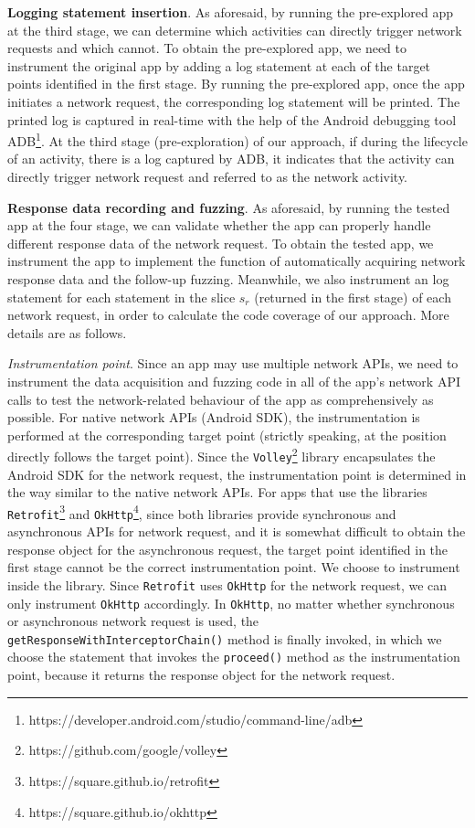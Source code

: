 \documentclass[sigconf,review, anonymous]{acmart}
\begin{document}
\textbf{Logging statement insertion}. As aforesaid, by running the pre-explored app at the third stage, we can determine which activities can directly trigger network requests and which cannot. To obtain the pre-explored app, we need to instrument the original app by adding a log statement at each of the target points identified in the first stage.  By running the pre-explored app, once the app initiates a network request, the corresponding log statement will be printed. The printed log is captured in real-time with the help of the Android debugging tool \textsf{ADB}\footnote{https://developer.android.com/studio/command-line/adb}. At the third stage (pre-exploration) of our approach, if during the lifecycle of an activity, there is a log captured by \textsf{ADB}, it indicates that the activity can directly trigger network request and referred to as the network activity.


\textbf{Response data recording and fuzzing}. As aforesaid, by running the tested app at the four stage, we can validate whether the app can properly handle different response data of the network request. To obtain the tested app,  
we instrument the app to implement the function of automatically acquiring network response data and the follow-up fuzzing. Meanwhile, we also instrument an log statement for each statement in the slice $s_r$ (returned in the first stage) of each network request, in order to calculate the code coverage of our approach. More details are as follows.

\textit{Instrumentation point}. Since an app may use multiple network APIs, we need to instrument the data acquisition and fuzzing code in all of the app's network API calls to test the network-related behaviour of the app as comprehensively as possible. For native network APIs (Android SDK), the instrumentation is performed at the corresponding target point (strictly speaking, at the position directly follows the target point). Since the \texttt{Volley}\footnote{https://github.com/google/volley} library encapsulates the Android SDK for the network request, the instrumentation point is determined in the way similar to the  native network APIs. For apps that use the libraries \texttt{Retrofit}\footnote{https://square.github.io/retrofit} and \texttt{OkHttp}\footnote{https://square.github.io/okhttp}, since both libraries provide synchronous and asynchronous APIs for network request, and it is somewhat difficult to obtain the response object for the asynchronous request, the target point identified in the first stage cannot be the correct instrumentation point. We choose to instrument inside the library. Since \texttt{Retrofit} uses \texttt{OkHttp} for the network request, we can only instrument \texttt{OkHttp} accordingly. In \texttt{OkHttp}, no matter whether synchronous or asynchronous network request is used, the  \texttt{getResponseWithInterceptorChain()} method is finally invoked, in which we choose the statement that invokes the \texttt{proceed()} method as the instrumentation point, because it returns the response object for the network request.  
\end{document}
